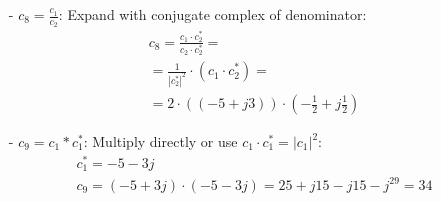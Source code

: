 \begin{enumerate}
\item[-]
$c_8 = \frac{c_1}{c_2}$: Expand with conjugate complex of denominator:
\[
\begin{aligned}
& c_8 = \frac{c_1\cdot c_2^*}{c_2 \cdot c_2^*} = \\
& = \frac{1}{|c_2^*|^2} \cdot (c_1 \cdot c_2^*) = \\
& = 2 \cdot ((-5+j 3)) \cdot (-\frac{1}{2} + j \frac{1}{2})
\end{aligned}
\]
\end{enumerate}

\begin{enumerate}
\item[-]
$c_9 = c_1 * c_1^*$: Multiply directly or use $c_1 \cdot c_1^* = |c_1|^2$:
\[
\begin{aligned}
& c_1^* = -5 - 3j \\
& c_9 = (-5 + 3j) \cdot (-5 - 3j) = 25 + j15 -j15 -j^29 = 34
\end{aligned}
\]
\end{enumerate}
